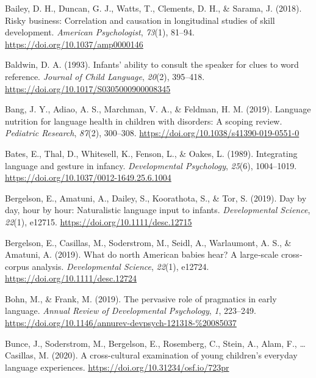 \documentclass[
  english,
  man,mask]{apa6}
\begin{document}
\leavevmode\hypertarget{ref-bailey_risky_2018}{}%
Bailey, D. H., Duncan, G. J., Watts, T., Clements, D. H., \& Sarama, J. (2018). Risky business: Correlation and causation in longitudinal studies of skill development. \emph{American Psychologist}, \emph{73}(1), 81--94. \url{https://doi.org/10.1037/amp0000146}

\leavevmode\hypertarget{ref-baldwin_infants_1993}{}%
Baldwin, D. A. (1993). Infants' ability to consult the speaker for clues to word reference. \emph{Journal of Child Language}, \emph{20}(2), 395--418. \url{https://doi.org/10.1017/S0305000900008345}

\leavevmode\hypertarget{ref-bang_language_2019}{}%
Bang, J. Y., Adiao, A. S., Marchman, V. A., \& Feldman, H. M. (2019). Language nutrition for language health in children with disorders: A scoping review. \emph{Pediatric Research}, \emph{87}(2), 300--308. \url{https://doi.org/10.1038/s41390-019-0551-0}

\leavevmode\hypertarget{ref-bates_integrating_1989}{}%
Bates, E., Thal, D., Whitesell, K., Fenson, L., \& Oakes, L. (1989). Integrating language and gesture in infancy. \emph{Developmental Psychology}, \emph{25}(6), 1004--1019. \url{https://doi.org/10.1037/0012-1649.25.6.1004}

\leavevmode\hypertarget{ref-bergelson_day_2019}{}%
Bergelson, E., Amatuni, A., Dailey, S., Koorathota, S., \& Tor, S. (2019). Day by day, hour by hour: Naturalistic language input to infants. \emph{Developmental Science}, \emph{22}(1), e12715. \url{https://doi.org/10.1111/desc.12715}

\leavevmode\hypertarget{ref-bergelson_what_2019}{}%
Bergelson, E., Casillas, M., Soderstrom, M., Seidl, A., Warlaumont, A. S., \& Amatuni, A. (2019). What do north American babies hear? A large‐scale cross‐corpus analysis. \emph{Developmental Science}, \emph{22}(1), e12724. \url{https://doi.org/10.1111/desc.12724}

\leavevmode\hypertarget{ref-bohn_pervasive_2019}{}%
Bohn, M., \& Frank, M. (2019). The pervasive role of pragmatics in early language. \emph{Annual Review of Developmental Psychology}, \emph{1}, 223--249. \url{https://doi.org/10.1146/annurev-devpsych-121318-\%20085037}

\leavevmode\hypertarget{ref-bunce_cross-cultural_2020}{}%
Bunce, J., Soderstrom, M., Bergelson, E., Rosemberg, C., Stein, A., Alam, F., \ldots{} Casillas, M. (2020). A cross-cultural examination of young children's everyday language experiences. \url{https://doi.org/10.31234/osf.io/723pr}
\end{document}
